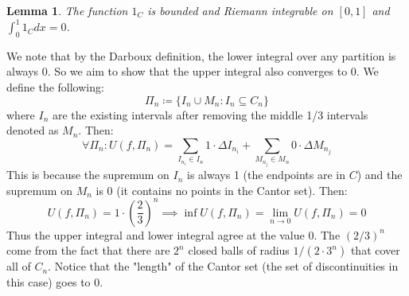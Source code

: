 \documentclass{exam}
\newtheorem{lem}{Lemma}[section]
\begin{document}
\begin{lem}
The function $1_C$ is bounded and Riemann integrable on $[0, 1]$ and $\int_{0}^{1}1_C dx = 0$.
\end{lem}
We note that by the Darboux definition, the lower integral over any partition is always $0$. So we aim to show that the upper integral also converges to $0$. We define the following:
\begin{equation*}
  \Pi_n \coloneq \{I_n \cup M_n: I_n \subseteq C_n\}
\end{equation*}
where $I_n$ are the existing intervals after removing the middle 1/3 intervals denoted as $M_n$. Then:
\begin{equation*}
  \forall \Pi_n: U(f, \Pi_n) = \sum_{I_{n_i} \in I_n}1 \cdot \Delta I_{n_i} + \sum_{M_{n_j} \in M_n} 0 \cdot \Delta M_{n_j}
\end{equation*} 
This is because the supremum on $I_n$ is always 1 (the endpoints are in $C$) and the supremum on $M_n$ is 0 (it contains no points in the Cantor set). Then:
\begin{equation*}
  U(f, \Pi_n) = 1 \cdot \left(\frac{2}{3}\right)^n \implies \inf U(f, \Pi_n) = \lim_{n \xrightarrow{} 0}U(f, \Pi_n) = 0
\end{equation*}
Thus the upper integral and lower integral agree at the value $0$. The $(2/3)^n$ come from the fact that there are $2^n$ closed balls of radius $1/(2 \cdot 3^n)$ that cover all of $C_n$. Notice that the "length" of the Cantor set (the set of discontinuities in this case) goes to 0.
\end{document}
